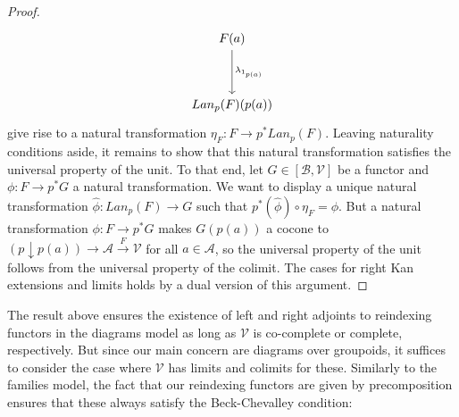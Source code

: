 \documentclass[a4paper,english]{lipics-v2018}
\begin{document}
\begin{theorem}
\begin{proof}
\[\begin{tikzcd}[row sep=huge, column sep=huge]
          F(a) \ar[d, "\lambda_{1_{p(a)}}"]\\
        Lan_p(F)(p(a))
        \end{tikzcd}
      \]
      give rise to a natural transformation $\eta_F : F \to p^*Lan_p(F)$.
      Leaving naturality conditions aside, it remains to show that this natural transformation satisfies the universal property of the unit. To that end, let $G \in [\mathcal{B}, \mathcal{V}]$ be a functor and $\phi : F \to p^*G$ a natural transformation. We want to display a unique natural transformation $\hat \phi : Lan_p(F) \to G$ such that $p^*(\hat \phi) \circ \eta_F = \phi$. But a natural transformation $\phi : F \to p^*G$ makes $G(p(a))$ a cocone to $(p \downarrow p(a)) \to \mathcal{A} \xrightarrow{F} \mathcal{V}$ for all $a \in \mathcal{A}$, so the universal property of the unit follows from the universal property of the colimit.
      The cases for right Kan extensions and limits holds by a dual version of this argument.
    \end{proof}
  \end{theorem}
The result above ensures the existence of left and right adjoints to reindexing functors in the diagrams model as long as $\mathcal{V}$ is co-complete or complete, respectively. But since our main concern are diagrams over groupoids, it suffices to consider the case where $\mathcal{V}$ has limits and colimits for these. Similarly to the families model, the fact that our reindexing functors are given by precomposition ensures that these always satisfy the Beck-Chevalley condition:
\end{document}
